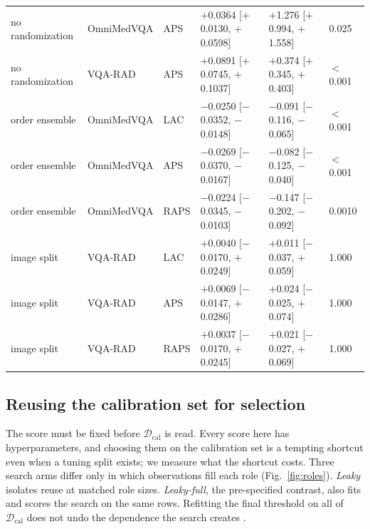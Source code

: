 \documentclass[a4paper,conference]{IEEEtran}
\newcommand{\Dcal}{\mathcal{D}_{\mathrm{cal}}}
\begin{document}
\begin{table}[tb]
\begin{tabular}{llllll}
no randomization & OmniMedVQA & APS & $+$0.0364 [$+$0.0130, $+$0.0598] & $+$1.276 [$+$0.994, $+$1.558] & 0.025 \\
no randomization & VQA-RAD & APS & $+$0.0891 [$+$0.0745, $+$0.1037] & $+$0.374 [$+$0.345, $+$0.403] & $<$0.001 \\
\midrule
order ensemble & OmniMedVQA & LAC & $-$0.0250 [$-$0.0352, $-$0.0148] & $-$0.091 [$-$0.116, $-$0.065] & $<$0.001 \\
order ensemble & OmniMedVQA & APS & $-$0.0269 [$-$0.0370, $-$0.0167] & $-$0.082 [$-$0.125, $-$0.040] & $<$0.001 \\
order ensemble & OmniMedVQA & RAPS & $-$0.0224 [$-$0.0345, $-$0.0103] & $-$0.147 [$-$0.202, $-$0.092] & 0.0010 \\
\midrule
image split & VQA-RAD & LAC & $+$0.0040 [$-$0.0170, $+$0.0249] & $+$0.011 [$-$0.037, $+$0.059] & 1.000 \\
image split & VQA-RAD & APS & $+$0.0069 [$-$0.0147, $+$0.0286] & $+$0.024 [$-$0.025, $+$0.074] & 1.000 \\
image split & VQA-RAD & RAPS & $+$0.0037 [$-$0.0170, $+$0.0245] & $+$0.021 [$-$0.027, $+$0.069] & 1.000 \\
\bottomrule
\end{tabular}
\end{table}

\subsection{Reusing the calibration set for selection}

The score must be fixed before $\Dcal$ is read. Every score here has
hyperparameters, and choosing them on the calibration set is a tempting
shortcut even when a tuning split exists; we measure what the shortcut costs.
Three search arms differ only in which observations fill each role
(Fig.~\ref{fig:roles}). \emph{Leaky} isolates reuse at matched role sizes.
\emph{Leaky-full}, the pre-specified contrast, also fits and scores the search
on the same rows. Refitting the final threshold on all of $\Dcal$ does not undo
the dependence the search creates \cite{zeng2025tuningbias}.
\end{document}
